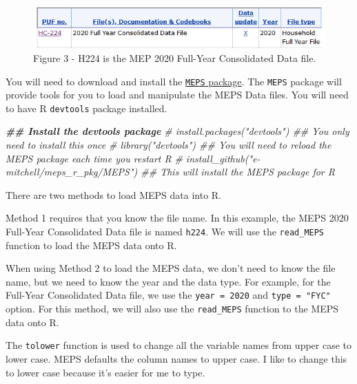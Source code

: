 \documentclass[
]{book}
\newenvironment{Shaded}{\begin{snugshade}}{\end{snugshade}}
\newcommand{\CommentTok}[1]{\textcolor[rgb]{0.56,0.35,0.01}{\textit{#1}}}
\newcommand{\DocumentationTok}[1]{\textcolor[rgb]{0.56,0.35,0.01}{\textbf{\textit{#1}}}}
\begin{document}
\begin{figure}
\includegraphics[width=1\linewidth]{Figure 3} \caption{Figure 3 - H224 is the MEP 2020 Full-Year Consolidated Data file.}\label{fig:unnamed-chunk-4}
\end{figure}

You will need to download and install the \href{https://github.com/e-mitchell/meps_r_pkg}{\texttt{MEPS} package}. The \texttt{MEPS} package will provide tools for you to load and manipulate the MEPS Data files. You will need to have R \texttt{devtools} package installed.

\begin{Shaded}
\begin{Highlighting}[]
\DocumentationTok{\#\# Install the devtools package}
\CommentTok{\# install.packages("devtools") \#\# You only need to install this once}
\CommentTok{\# library("devtools")  \#\# You will need to reload the MEPS package each time you restart R}
\CommentTok{\# install\_github("e{-}mitchell/meps\_r\_pkg/MEPS") \#\# This will install the MEPS package for R}
\end{Highlighting}
\end{Shaded}

There are two methods to load MEPS data into R.

Method 1 requires that you know the file name. In this example, the MEPS 2020 Full-Year Consolidated Data file is named \texttt{h224}. We will use the \texttt{read\_MEPS} function to load the MEPS data onto R.

When using Method 2 to load the MEPS data, we don't need to know the file name, but we need to know the year and the data type. For example, for the Full-Year Consolidated Data file, we use the \texttt{year\ =\ 2020} and \texttt{type\ =\ "FYC"} option. For this method, we will also use the \texttt{read\_MEPS} function to the MEPS data onto R.

The \texttt{tolower} function is used to change all the variable names from upper case to lower case. MEPS defaults the column names to upper case. I like to change this to lower case because it's easier for me to type.
\end{document}
